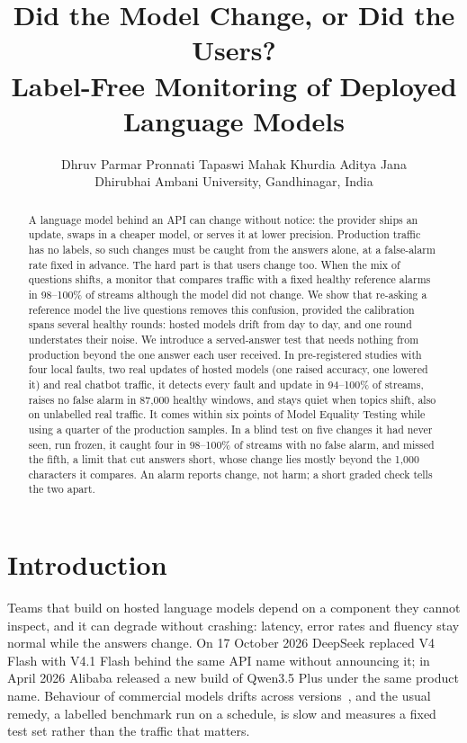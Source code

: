 \documentclass{article}
\title{Did the Model Change, or Did the Users?\\Label-Free Monitoring of Deployed Language Models}
\author{%
  Dhruv Parmar \quad Pronnati Tapaswi \quad Mahak Khurdia \quad Aditya Jana \\
  Dhirubhai Ambani University, Gandhinagar, India
}
\begin{document}
\maketitle

\begin{abstract}
A language model behind an API can change without notice: the provider ships an
update, swaps in a cheaper model, or serves it at lower precision. Production
traffic has no labels, so such changes must be caught from the answers alone, at
a false-alarm rate fixed in advance. The hard part is that users change too. When
the mix of questions shifts, a monitor that compares traffic with a fixed healthy
reference alarms in 98--100\% of streams although the model did not change. We
show that re-asking a reference model the live questions removes this confusion,
provided the calibration spans several healthy rounds: hosted models drift from
day to day, and one round understates their noise. We introduce a served-answer
test that needs nothing from production beyond the one answer each user received.
In pre-registered studies with four local faults, two real updates of hosted
models (one raised accuracy, one lowered it) and real chatbot traffic, it detects every
fault and update in 94--100\% of streams, raises no false alarm in 87{,}000
healthy windows, and stays quiet when topics shift, also on unlabelled real
traffic. It comes within six points of Model Equality Testing while using a
quarter of the production samples. In a blind test on five changes it had never
seen, run frozen, it caught four in 98--100\% of streams with no false alarm, and
missed the fifth, a limit that cut answers short, whose change lies mostly
beyond the 1{,}000 characters it compares. An alarm reports change, not harm; a short graded check tells the two
apart.
\end{abstract}

\section{Introduction}

Teams that build on hosted language models depend on a component they cannot
inspect, and it can degrade without crashing: latency, error rates and fluency stay
normal while the answers change. On 17 October 2026 DeepSeek replaced V4 Flash with V4.1 Flash behind the
same API name without announcing it; in April 2026 Alibaba released a new build
of Qwen3.5 Plus under the same product name. Behaviour of
commercial models drifts across versions~\citep{chen2023chatgpt}, and the usual
remedy, a labelled benchmark run on a schedule, is slow and measures a fixed test
set rather than the traffic that matters.
\end{document}
